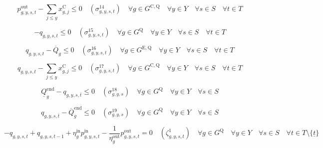 \documentclass{article}
\newcommand{\sStorage}{G^{\mathrm{Q}}}
\newcommand{\sStorageExisting}{G^{\mathrm{E,Q}}}
\newcommand{\sStorageCandidate}{G^{\mathrm{C,Q}}}
\newcommand{\sYears}{Y}
\newcommand{\sScenarios}{S}
\newcommand{\sIntervals}{T}
\newcommand{\iGenerator}{g}
\newcommand{\iYear}{y}
\newcommand{\iYearAlias}{j}
\newcommand{\iScenario}{s}
\newcommand{\iInterval}{t}
\newcommand{\iIntervalTerminal}{\overline{\iInterval}}
\newcommand{\iIntervalStart}{\underline{\iInterval}}
\newcommand{\cStorageUnitEnergyMax}[1][\iGenerator]{\overline{Q}_{#1}}
\newcommand{\cStorageUnitEnergyIntervalEndMax}[1][\iGenerator]{\overline{Q}^{\mathrm{end}}_{#1}}
\newcommand{\cStorageUnitEnergyIntervalEndMin}[1][\iGenerator]{\underline{Q}^{\mathrm{end}}_{#1}}
\newcommand{\cStorageUnitEfficiencyCharging}{\eta_{\iGenerator}^{\mathrm{in}}}
\newcommand{\cStorageUnitEfficiencyDischarging}{\eta_{\iGenerator}^{\mathrm{out}}}
\newcommand{\vInstalledCapacity}[1][\iGenerator,\iYear]{x^{\mathrm{C}}_{#1}}
\newcommand{\vPowerIn}[1][\iGenerator,\iYear,\iScenario,\iInterval]{p^{\mathrm{in}}_{#1}}
\newcommand{\vPowerOut}[1][\iGenerator,\iYear,\iScenario,\iInterval]{p^{\mathrm{out}}_{#1}}
\newcommand{\vStorageUnitEnergy}[1][\iGenerator,\iYear,\iScenario,\iInterval]{q_{#1}}
\newcommand{\dMaxDischargingRateCandidate}[1][\iGenerator,\iYear,\iScenario,\iInterval]{\sigma_{#1}^{14}}
\newcommand{\dNonNegativeStorageEnergy}[1][\iGenerator,\iYear,\iScenario,\iInterval]{\sigma_{#1}^{15}}
\newcommand{\dMaxStorageEnergyExisting}[1][\iGenerator,\iYear,\iScenario,\iInterval]{\sigma_{#1}^{16}}
\newcommand{\dMaxStorageEnergyCandidate}[1][\iGenerator,\iYear,\iScenario,\iInterval]{\sigma_{#1}^{17}}
\newcommand{\dMinStorageEnergyIntervalEnd}[1][\iGenerator,\iYear,\iScenario]{\sigma_{#1}^{18}}
\newcommand{\dMaxStorageEnergyIntervalEnd}[1][\iGenerator,\iYear,\iScenario]{\sigma_{#1}^{19}}
\newcommand{\dStorageEnergyTransition}[1][\iGenerator,\iYear,\iScenario,\iInterval]{\zeta_{#1}^{1}}
\newcommand{\sScenarioSets}{\quad \forall \iYear \in \sYears \quad \forall \iScenario \in \sScenarios \quad \forall \iInterval \in \sIntervals}
\begin{document}
\begin{equation}
	\vPowerOut - \sum\limits_{\iYearAlias \leq \iYear} \vInstalledCapacity[\iGenerator,\iYearAlias] \leq 0 \quad (\dMaxDischargingRateCandidate) \quad \forall \iGenerator \in \sStorageCandidate \sScenarioSets
\end{equation}

\begin{equation}
	- \vStorageUnitEnergy \leq 0 \quad (\dNonNegativeStorageEnergy) \quad \forall \iGenerator \in \sStorage \sScenarioSets
\end{equation}

\begin{equation}
	\vStorageUnitEnergy - \cStorageUnitEnergyMax \leq 0 \quad (\dMaxStorageEnergyExisting) \quad \forall \iGenerator \in \sStorageExisting \sScenarioSets
\end{equation}

\begin{equation}
	\vStorageUnitEnergy - \sum\limits_{\iYearAlias \leq \iYear} \vInstalledCapacity[\iGenerator,\iYearAlias] \leq 0 \quad (\dMaxStorageEnergyCandidate) \quad \forall \iGenerator \in \sStorageCandidate \sScenarioSets
\end{equation}

\begin{equation}
	\cStorageUnitEnergyIntervalEndMin - \vStorageUnitEnergy[\iGenerator,\iYear,\iScenario,\iIntervalTerminal]\leq  0 \quad (\dMinStorageEnergyIntervalEnd) \quad \forall \iGenerator \in \sStorage \quad \forall \iYear \in \sYears \quad \forall \iScenario \in \sScenarios
\end{equation}

\begin{equation}
	\vStorageUnitEnergy[\iGenerator,\iYear,\iScenario,\iIntervalTerminal] - \cStorageUnitEnergyIntervalEndMax \leq  0 \quad (\dMaxStorageEnergyIntervalEnd) \quad \forall \iGenerator \in \sStorage \quad \forall \iYear \in \sYears \quad \forall \iScenario \in \sScenarios
\end{equation}

\begin{equation}
	- \vStorageUnitEnergy + \vStorageUnitEnergy[\iGenerator,\iYear,\iScenario,\iInterval-1] + \cStorageUnitEfficiencyCharging \vPowerIn - \frac{1}{\cStorageUnitEfficiencyDischarging} \vPowerOut = 0 \quad (\dStorageEnergyTransition) \quad \forall \iGenerator \in \sStorage \sScenarioSets \setminus \{\iIntervalStart\}
\end{equation}
\end{document}
